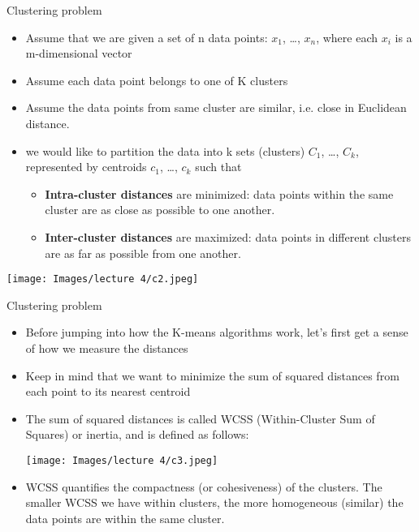 \documentclass[xcolor=dvipsnames, 9pt]{beamer} %
\begin{document}
\begin{frame}{Clustering problem}
\begin{itemize}
    \item Assume that we are given a set of n data points: {$x_{1}$, …, $x_{n}$}, where each $x_{i}$ is a m-dimensional vector
    \item Assume each data point belongs to one of K clusters
    \item Assume the data points from same cluster are similar, i.e. close in Euclidean distance.
    \item we would like to partition the data into k sets (clusters) {$C_{1}$, …, $C_{k}$}, represented by centroids {$c_{1}$, …, $c_{k}$} such that 
    \begin{itemize}
        \item \textbf{Intra-cluster distances} are minimized: data points within the same cluster are as close as possible to one another.
        \item \textbf{Inter-cluster distances} are maximized: data points in different clusters are as far as possible from one another.
        
    \end{itemize}
\end{itemize}
\begin{center}
\texttt{[image: Images/lecture 4/c2.jpeg]}
\end{center}
\end{frame}

\begin{frame}{Clustering problem}
\begin{itemize}
    \item Before jumping into how the K-means algorithms work, let's first get a sense of how we measure the distances
    \item Keep in mind that we want to minimize the sum of squared distances from each point to its nearest centroid
    \item The sum of squared distances is called WCSS (Within-Cluster Sum of Squares) or inertia, and is defined as follows:
    \begin{center}
\texttt{[image: Images/lecture 4/c3.jpeg]}
\end{center}
    \item WCSS quantifies the compactness (or cohesiveness) of the clusters. The smaller WCSS we have within clusters, the more homogeneous (similar) the data points are within the same cluster.
\end{itemize}
\end{frame}
\end{document}

